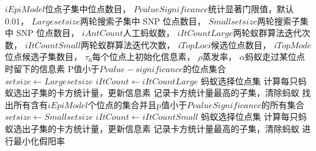 \documentclass[11pt]{ctexart}
\begin{document}
  
    \begin{algorithm}  
        \begin{algorithmic}[1] %
            \Require    $iEpiModel$位点子集中位点数目，
                        $PvalueSignificance$统计显著门限值，默认 0.01，
                        $Largesetsize$两轮搜索子集中 SNP 位点数目，
                        $Smallsetsize$两轮搜索子集中 SNP 位点数目，
                        $iAntCount$人工蚂蚁数，
                        $iItCountLarge$两轮蚁群算法迭代次数，
                        $iItCountSmall$两轮蚁群算法迭代次数，
                        $iTopLoci$候选位点数目，
                        $iTopMode$位点候选子集数目，
                        $\tau_{0}$每个位点上初始化信息素，
                        $\rho$蒸发率，
                        $\alpha$蚂蚁走过某位点时留下的信息素
            \Ensure P值小于$Pvalue-significance$的位点集合
                \State $setsize\gets Largesetsize$
                \State $iItCount\gets iItCountLarge$
                    \State 蚂蚁选择位点集
                    \State 计算每只蚂蚁选出子集的卡方统计量，更新信息素
                    \State 记录卡方统计量最高的子集，清除蚂蚁
                \EndFor 
                \State 找出所有含有$iEpiModel$个位点的集合并且p值小于$PvalueSignificance$的所有集合  
                \State $setsize\gets Smallsetsize$
                \State $iItCount\gets iItCountSmall$
                    \State 蚂蚁选择位点集
                    \State 计算每只蚂蚁选出子集的卡方统计量，更新信息素
                    \State 记录卡方统计量最高的子集，清除蚂蚁
                \EndFor
                \State 进行最小化假阳率
            \EndFunction  
        \end{algorithmic}  
    \end{algorithm}  
\end{document}
